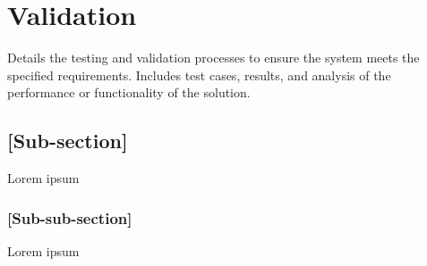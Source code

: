 \chapter{Validation} 
Details the testing and validation processes to ensure the system meets the specified requirements. Includes test cases, results, and analysis of the performance or functionality of the solution. 
\section{[Sub-section]} Lorem ipsum 
\subsection{[Sub-sub-section]} Lorem ipsum
